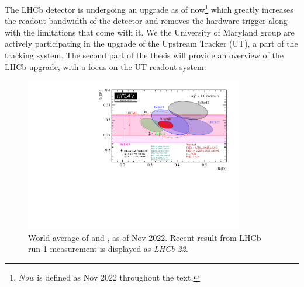 The LHCb detector is undergoing an upgrade as of now\footnote{
    \emph{Now} is defined as Nov 2022 throughout the text.
} which greatly increases
the readout bandwidth of the detector and removes the hardware trigger along
with the limitations that come with it.
We the University of Maryland group are actively participating in the upgrade
of the Upstream Tracker (UT), a part of the tracking system.
The second part of the thesis will provide an overview of the LHCb upgrade, with
a focus on the UT readout system.

\begin{figure}[htb]
    \centering
    \includegraphics[width=0.85\textwidth]{./figs-intro/hflav_2022_preliminary.pdf}
    \caption{
        World average of \RD and \RDst, as of Nov 2022.
        Recent result from LHCb run 1 measurement is displayed as
        \emph{LHCb 22}.
    }
    \label{fig:hflav}
\end{figure}

